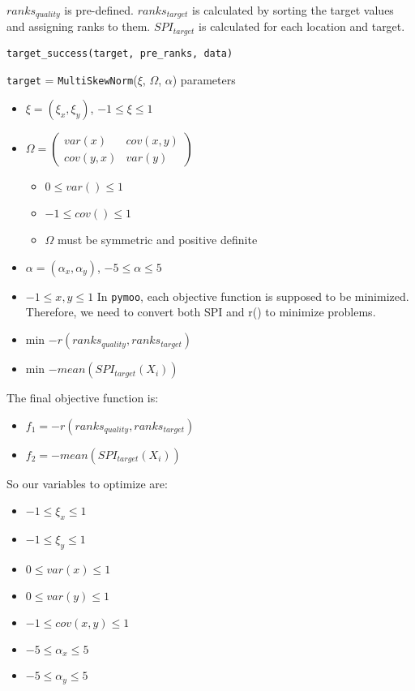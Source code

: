 \documentclass[
  authoryear,
  preprint,
  3p]{elsarticle}
\providecommand{\tightlist}{%
  \setlength{\itemsep}{0pt}\setlength{\parskip}{0pt}}\usepackage{longtable,booktabs,array}
\begin{document}
\(ranks_{quality}\) is pre-defined. \(ranks_{target}\) is calculated by
sorting the target values and assigning ranks to them. \(SPI_{target}\)
is calculated for each location and target.

\texttt{target\_success(target,\ pre\_ranks,\ data)}

\texttt{target} = \texttt{MultiSkewNorm}(\(\xi\), \(\Omega\),
\(\alpha\)) parameters

\begin{itemize}
\item
  \(\xi = (\xi_x, \xi_y)\), \(-1 \leq \xi \leq 1\)
\item
  \(\Omega = \begin{pmatrix} var(x) & cov(x, y) \\ cov(y, x) & var(y) \end{pmatrix}\)

  \begin{itemize}
  \tightlist
  \item
    \(0 \leq var() \leq 1\)
  \item
    \(-1 \leq cov() \leq 1\)
  \item
    \(\Omega\) must be symmetric and positive definite
  \end{itemize}
\item
  \(\alpha = (\alpha_x, \alpha_y)\), \(-5 \leq \alpha \leq 5\)
\item
  \(-1 \leq x, y \leq 1\) In \texttt{pymoo}, each objective function is
  supposed to be minimized. Therefore, we need to convert both SPI and
  r() to minimize problems.
\item
  min \(-r(ranks_{quality}, ranks_{target})\)
\item
  min \(-mean(SPI_{target}(X_i))\)
\end{itemize}

The final objective function is:

\begin{itemize}
\tightlist
\item
  \(f_1 = -r(ranks_{quality}, ranks_{target})\)
\item
  \(f_2 = -mean(SPI_{target}(X_i))\)
\end{itemize}

So our variables to optimize are:

\begin{itemize}
\tightlist
\item
  \(-1 \leq \xi_x \leq 1\)
\item
  \(-1 \leq \xi_y \leq 1\)
\item
  \(0 \leq var(x) \leq 1\)
\item
  \(0 \leq var(y) \leq 1\)
\item
  \(-1 \leq cov(x, y) \leq 1\)
\item
  \(-5 \leq \alpha_x \leq 5\)
\item
  \(-5 \leq \alpha_y \leq 5\)
\end{itemize}
\end{document}
